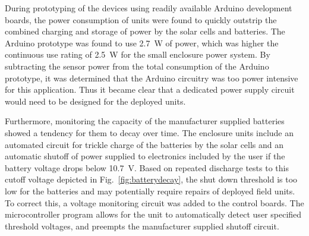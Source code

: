 \documentclass[numbook, envcountsect, envcountsame, envcountreset, runningheads, twocolumn]{svjour3}
\begin{document}
			
			During prototyping of the devices using readily available Arduino development boards, the power consumption of units were found to quickly outstrip the combined charging and storage of power by the solar cells and batteries.  The Arduino prototype was found to use \SI{2.7}{\watt} of power, which was higher the continuous use rating of \SI{2.5}{\watt} for the small enclosure power system.  By subtracting the sensor power from the total consumption of the Arduino prototype, it was determined that the Arduino circuitry was too power intensive for this application.  Thus it became clear that a dedicated power supply circuit would need to be designed for the deployed units.  
			
			Furthermore, monitoring the capacity of the manufacturer supplied batteries showed a tendency for them to decay over time.  The enclosure units include an automated circuit for trickle charge of the batteries by the solar cells and an automatic shutoff of power supplied to electronics included by the user if the battery voltage drops below \SI{10.7}{\volt}.  Based on repeated discharge tests to this cutoff voltage depicted in Fig.~\ref{fig:batterydecay}, the shut down threshold is too low for the batteries and may potentially require repairs of deployed field units.  To correct this, a voltage monitoring circuit was added to the control boards.  The microcontroller program allows for the unit to automatically detect user specified threshold voltages, and preempts the manufacturer supplied shutoff circuit.  
			
\end{document}
